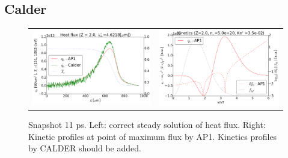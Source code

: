 \subsection{Calder}
\label{sec:CALDERcode}

\begin{figure}[tbh]
  \begin{center}
    \begin{tabular}{cc}
      \includegraphics[width=\figscale\textwidth]{../VFPdata/C7_Calder_case1_heatflux.png} & 
      \includegraphics[width=\figscale\textwidth]{../VFPdata/C7_Calder_case1_kinetics.png}
    \end{tabular}
  \caption{  
  Snapshot 11 ps. Left: correct steady solution of heat flux. Right: Kinetic profiles at point of maximum flux by AP1. Kinetics profiles by CALDER should be added.
  }
  \end{center}
  \label{fig:C7_CALDER_case1}
\end{figure}

